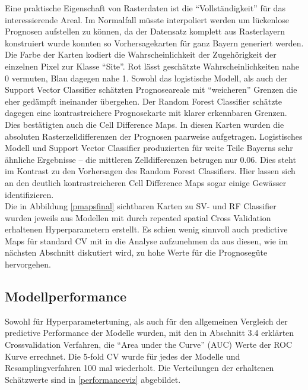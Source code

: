 Eine praktische Eigenschaft von Rasterdaten ist die ``Vollständigkeit'' für das interessierende Areal. Im Normalfall müsste interpoliert werden um lückenlose Prognosen aufstellen zu können, da der Datensatz komplett aus Rasterlayern konstruiert wurde konnten so Vorhersagekarten für ganz Bayern generiert werden. Die Farbe der Karten kodiert die Wahrscheinlichkeit der Zugehörigkeit der einzelnen Pixel zur Klasse ``Site''. Rot lässt geschätzte Wahrscheinlichkeiten nahe 0 vermuten, Blau dagegen nahe 1. Sowohl das logistische Modell, als auch der Support Vector Classifier schätzten Prognoseareale mit ``weicheren'' Grenzen die eher gedämpft ineinander übergehen. Der Random Forest Classifier schätzte dagegen eine kontrastreichere Prognosekarte mit klarer erkennbaren Grenzen. Dies bestätigten auch die Cell Difference Maps. In diesen Karten wurden die absoluten Rasterzelldifferenzen der Prognosen paarweise aufgetragen. Logistisches Modell und Support Vector Classifier produzierten für weite Teile Bayerns sehr ähnliche Ergebnisse -- die mittleren Zelldifferenzen betrugen nur 0.06. Dies steht im Kontrast zu den Vorhersagen des Random Forest Classifiers. Hier lassen sich an den deutlich kontrastreicheren Cell Difference Maps sogar einige Gewässer identifizieren. \\
Die in Abbildung \ref{pmapsfinal} sichtbaren Karten zu SV- und RF Classifier wurden jeweils aus Modellen mit durch repeated spatial Cross Validation erhaltenen Hyperparametern erstellt. Es schien wenig sinnvoll auch predictive Maps für standard CV mit in die Analyse aufzunehmen da aus diesen, wie im nächsten Abschnitt diskutiert wird, zu hohe Werte für die Prognosegüte hervorgehen. 

\subsection{Modellperformance}

Sowohl für Hyperparametertuning, als auch für den allgemeinen Vergleich der predictive Performance der Modelle wurden, mit den in Abschnitt 3.4 erklärten Crossvalidation Verfahren, die ``Area under the Curve'' (AUC) Werte der ROC Kurve errechnet. Die 5-fold CV wurde für jedes der Modelle und Resamplingverfahren 100 mal wiederholt. Die Verteilungen der erhaltenen Schätzwerte sind in \ref{performanceviz} abgebildet.

